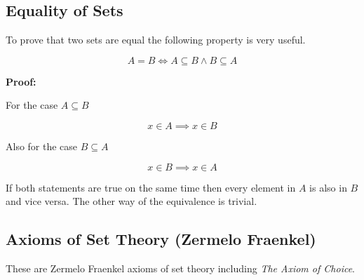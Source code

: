 \QED

\subsection{Equality of Sets}

To prove that two sets are equal the following property is very useful.

\[
	A = B \iff A \subseteq B \land B \subseteq A
\]

\textbf{Proof:}

For the case \(A \subseteq B\)

\[
	x \in A \implies x \in B 
\]

Also for the case \(B \subseteq A \)

\[
	x \in B \implies x \in A 
\]

If both statements are true on the same time then every element in \(A\) is also in \(B\) and vice versa.
The other way of the equivalence is trivial.

\QED

\subsection{Axioms of Set Theory (Zermelo Fraenkel)}

These are Zermelo Fraenkel axioms of set theory including \emph{The Axiom of Choice}.

